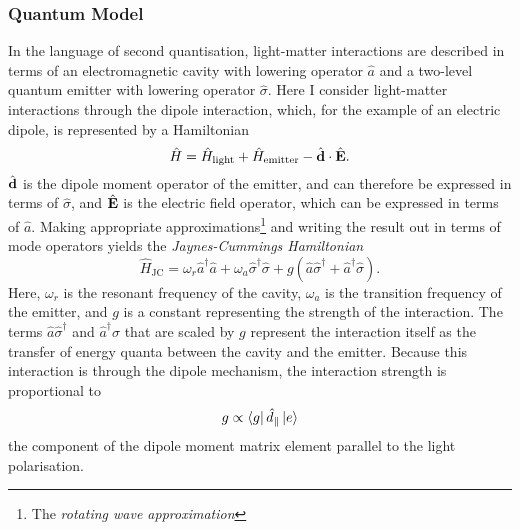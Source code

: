 \subsubsection{Quantum Model}
In the language of second quantisation, light-matter interactions are described in terms of an electromagnetic cavity with lowering operator $\hat{a}$ and a two-level quantum emitter with lowering operator $\hat{\sigma}$. Here I consider light-matter interactions through the dipole interaction, which, for the example of an electric dipole, is represented by a Hamiltonian
\begin{equation}
    \hat{H} = \hat{H}_\text{light} + \hat{H}_\text{emitter} - \hat{\boldsymbol{\mathbf{d}}} \cdot \hat{\boldsymbol{\mathbf{E}}}.
\end{equation}
$\hat{\boldsymbol{\mathbf{d}}}$ is the dipole moment operator of the emitter, and can therefore be expressed in terms of $\hat{\sigma}$, and $\hat{\boldsymbol{\mathbf{E}}}$ is the electric field operator, which can be expressed in terms of $\hat{a}$. Making appropriate approximations\footnote{The \textit{rotating wave approximation}} and writing the result out in terms of mode operators yields the \textit{Jaynes-Cummings Hamiltonian}\cite{jaynes_cummings_1963,gerry_knight_book}
\begin{equation}
    \hat{H}_\text{JC} = \omega_r\hat{a}^\dagger\hat{a} + \omega_a\hat{\sigma}^\dagger\hat{\sigma} + g(\hat{a}\hat{\sigma}^\dagger + \hat{a}^\dagger\hat{\sigma}). \label{eq:jaynes_cummings_hamiltonian}
\end{equation}
Here, $\omega_r$ is the resonant frequency of the cavity, $\omega_a$ is the transition frequency of the emitter, and $g$ is a constant representing the strength of the interaction. The terms $\hat{a}\hat{\sigma}^\dagger$ and $\hat{a}^\dagger\hat{\sigma}$ that are scaled by $g$ represent the interaction itself as the transfer of energy quanta between the cavity and the emitter. Because this interaction is through the dipole mechanism, the interaction strength is proportional to
\begin{equation}
    g \propto \left\langle g\right| \hat{d}_{\parallel} \left|e\right\rangle \label{eq:g_dipole_moment}
\end{equation}
the component of the dipole moment matrix element parallel to the light polarisation.

